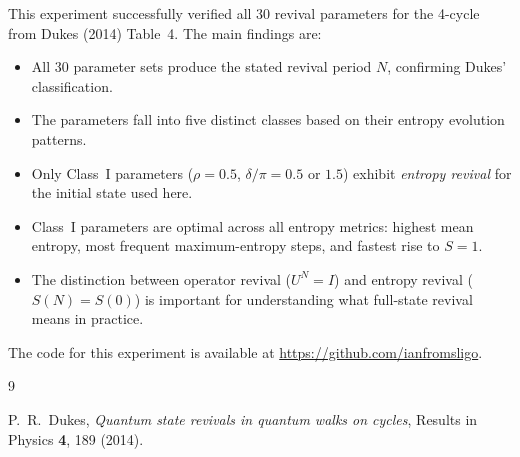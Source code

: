 \documentclass[12pt,a4paper]{article}
\begin{document}
This experiment successfully verified all 30 revival parameters for the 4-cycle from Dukes (2014) Table~4. The main findings are:

\begin{itemize}
    \item All 30 parameter sets produce the stated revival period $N$, confirming Dukes' classification.
    \item The parameters fall into five distinct classes based on their entropy evolution patterns.
    \item Only Class~I parameters ($\rho = 0.5$, $\delta/\pi = 0.5$ or $1.5$) exhibit \emph{entropy revival} for the initial state used here.
    \item Class~I parameters are optimal across all entropy metrics: highest mean entropy, most frequent maximum-entropy steps, and fastest rise to $S=1$.
    \item The distinction between operator revival ($U^N = I$) and entropy revival ($S(N) = S(0)$) is important for understanding what full-state revival means in practice.
\end{itemize}

The code for this experiment is available at \url{https://github.com/ianfromsligo}.

\begin{thebibliography}{9}

P.~R.~Dukes,
\textit{Quantum state revivals in quantum walks on cycles},
Results in Physics \textbf{4}, 189 (2014).

\end{thebibliography}
\end{document}
